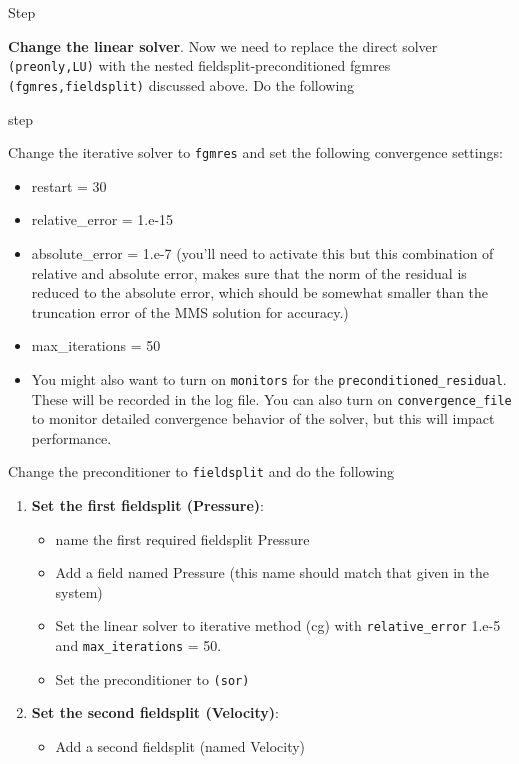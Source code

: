\begin{steps}{Step}
\item \textbf{Change the linear solver}.  Now we need to replace the
  direct solver \texttt{(preonly,LU)} with the nested
  fieldsplit-preconditioned fgmres \texttt{(fgmres,fieldsplit)}
  discussed above.  Do the following
  \begin{steps}{step}
  \item Change the iterative solver to \texttt{fgmres} and set the
    following convergence settings:
    \begin{itemize}
    \item restart = 30
    \item relative\_error = 1.e-15
    \item absolute\_error = 1.e-7 (you'll need to activate this but
      this combination of relative and absolute error, makes sure that
      the norm of the residual is reduced to the absolute error, which
      should be somewhat smaller than the truncation error of the MMS
      solution for accuracy.)
    \item max\_iterations = 50
    \item You might also want to turn on \texttt{monitors} for the
      \texttt{preconditioned\_residual}. These will be recorded in the
      log file.  You can also turn on \texttt{convergence\_file} to
      monitor detailed convergence behavior of the solver, but this
      will impact performance.
    \end{itemize}
  \item Change the preconditioner to \texttt{fieldsplit} and do the following
    \begin{enumerate}
    \item \textbf{Set the first fieldsplit (Pressure)}:
      \begin{itemize}
      \item name the first required fieldsplit Pressure
      \item Add a field named Pressure (this name should match that
        given in the system)
      \item Set the linear solver to iterative method (cg) with
        \texttt{relative\_error} 1.e-5 and \texttt{max\_iterations} = 50.
      \item Set the preconditioner to \texttt{(sor)}
      \end{itemize}
    \item \textbf{Set the second fieldsplit (Velocity)}:
      \begin{itemize}
      \item Add a second fieldsplit (named Velocity)

\end{itemize}
\end{enumerate}
\end{steps}
\end{steps}
